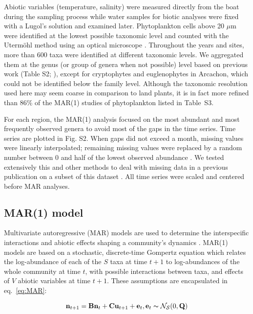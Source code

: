 \documentclass[10pt]{article}
\begin{document}
Abiotic variables (temperature, salinity) were measured directly from
the boat during the sampling process while water samples for biotic
analyses were fixed with a Lugol's solution and examined later. Phytoplankton
cells above 20 $\mu$m were identified at the lowest possible taxonomic
level and counted with the Utermöhl method using an optical microscope
\citep{utermohl_zur_1958}. Throughout the years and sites, more than
600 taxa were identified at different taxonomic levels. We aggregated
them at the genus (or group of genera when not possible) level based
on previous work (Table S2; \citealt{hernandez_farinas_assessing_2015,barraquand_coastal_2018}),
except for cryptophytes and euglenophytes in Arcachon, which could
not be identified below the family level. Although the taxonomic resolution
used here may seem coarse in comparison to land plants, it is in fact
more refined than 86\% of the MAR(1) studies of phytoplankton listed
in Table~S3.

For each region, the MAR(1) analysis focused on the most abundant
and most frequently observed genera to avoid most of the gaps in the
time series. Time series are plotted in Fig. S2. When gaps did not
exceed a month, missing values were linearly interpolated; remaining
missing values were replaced by a random number between 0 and half
of the lowest observed abundance \citep{hampton_coalescence_2006}.
We tested extensively this and other methods to deal with missing
data in a previous publication on a subset of this dataset \citep{barraquand_coastal_2018}.
All time series were scaled and centered before MAR analyses.

\subsection*{MAR(1) model}

Multivariate autoregressive (MAR) models are used to determine the
interspecific interactions and abiotic effects shaping a community's
dynamics \citep{ives_estimating_2003}. MAR(1) models are based on
a stochastic, discrete-time Gompertz equation which relates the log-abundance
of each of the $S$ taxa at time $t+1$ to log-abundances of the whole
community at time $t$, with possible interactions between taxa, and
effects of $V$ abiotic variables at time $t+1$. These assumptions
are encapsulated in eq.~\ref{eq:MAR}:

\begin{equation}
\mathbf{n}_{t+1}=\mathbf{B}\mathbf{n}_{t}+\textbf{C}\textbf{u}_{t+1}+\mathbf{e}_{t},\mathbf{e}_{t}\thicksim\mathcal{{N_{S}}}(0,\mathbf{Q})\label{eq:MAR}
\end{equation}
\end{document}
